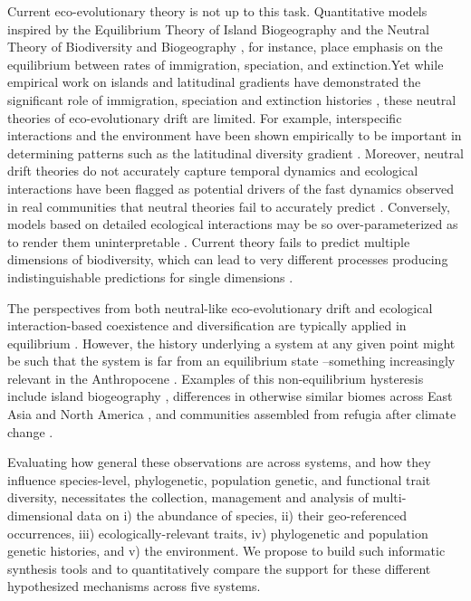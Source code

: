 \documentclass[11pt]{article}
\begin{document}
Current eco-evolutionary theory is not up to this task. Quantitative
models inspired by the Equilibrium Theory of Island Biogeography
\cite{MacArthur1967-ux} and the Neutral Theory of Biodiversity and
Biogeography \cite{Hubbell2001-dx}, for instance, place emphasis on the
equilibrium between rates of immigration, speciation, and extinction.Yet
while empirical work on islands and latitudinal gradients have
demonstrated the significant role of immigration, speciation and
extinction histories \cite{Gillespie2004-zv, Owens2017-ja}, these neutral
theories of eco-evolutionary drift are limited. For example,
interspecific interactions and the environment have been shown
empirically to be important in determining patterns such as the
latitudinal diversity gradient
\cite{Janzen1967-fk,Mittelbach2007-ui,Pianka1966-ky}. Moreover, neutral
drift theories do not accurately capture temporal dynamics
\cite{Ricklefs2006-tn, Chisholm2014-mu} and ecological interactions have
been flagged as potential drivers of the fast dynamics observed in real
communities that neutral theories fail to accurately predict
\cite{Rosindell2015-gp,Ricklefs2006-tn}. Conversely, models based on
detailed ecological interactions may be so over-parameterized as to
render them uninterpretable \cite{Rosindell2012-pm}. Current theory
fails to predict multiple dimensions of biodiversity, which can lead to
very different processes producing indistinguishable predictions for
single dimensions
\cite{Chisholm2010-yg,McGill2003-sf,McGill2007-zd,Leibold2017-jv}.

The perspectives from both neutral-like eco-evolutionary drift and
ecological interaction-based coexistence and diversification are
typically applied in equilibrium
\cite{Rominger_undated-cw,Etienne2007-we,Chesson2000-uc,Hubbell2001-dx}.
However, the history underlying a system at any given point might be
such that the system is far from an equilibrium state --something
increasingly relevant in the Anthropocene \cite{Barnosky2012-qz}.
Examples of this non-equilibrium hysteresis include island biogeography
\cite{Ricklefs2001-af}, differences in otherwise similar biomes across
East Asia and North America \cite{Qian2005-co,Yu2017-cc}, and
communities assembled from refugia after climate change
\cite{Carnaval2008-og,Carnaval2009-vd,Burbrink2016-nu}.

Evaluating how general these observations are across systems, and how
they influence species-level, phylogenetic, population genetic, and
functional trait diversity, necessitates the collection, management and
analysis of multi-dimensional data on i) the abundance of species, ii)
their geo-referenced occurrences, iii) ecologically-relevant traits, iv)
phylogenetic and population genetic histories, and v) the environment.
We propose to build such informatic synthesis tools and to
quantitatively compare the support for these different hypothesized
mechanisms across five systems.
\end{document}
